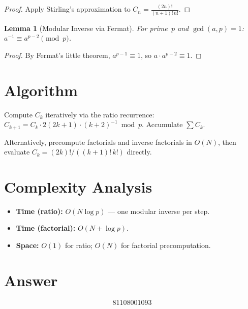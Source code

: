 \documentclass[11pt]{article}
\newtheorem{lemma}[theorem]{Lemma}
\theoremstyle{definition}
\begin{document}
\begin{proof}
Apply Stirling's approximation to $C_n = \frac{(2n)!}{(n+1)!\,n!}$.
\end{proof}

\begin{lemma}[Modular Inverse via Fermat]
For prime~$p$ and $\gcd(a,p) = 1$: $a^{-1} \equiv a^{p-2}\pmod{p}$.
\end{lemma}

\begin{proof}
By Fermat's little theorem, $a^{p-1} \equiv 1$, so $a \cdot a^{p-2} \equiv 1$.
\end{proof}

\section{Algorithm}

Compute $C_k$ iteratively via the ratio recurrence: $C_{k+1} = C_k \cdot 2(2k{+}1) \cdot (k{+}2)^{-1} \bmod p$. Accumulate $\sum C_k$.

Alternatively, precompute factorials and inverse factorials in $O(N)$, then evaluate $C_k = (2k)! / ((k{+}1)!\,k!)$ directly.

\section{Complexity Analysis}

\begin{itemize}
    \item \textbf{Time (ratio):} $O(N\log p)$ --- one modular inverse per step.
    \item \textbf{Time (factorial):} $O(N + \log p)$.
    \item \textbf{Space:} $O(1)$ for ratio; $O(N)$ for factorial precomputation.
\end{itemize}

\section{Answer}

\[
\boxed{81108001093}
\]
\end{document}

